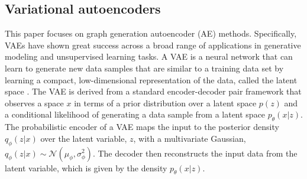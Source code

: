 \subsection{Variational autoencoders}
This paper focuses on graph generation autoencoder (AE) methods. Specifically, VAEs have shown great success across a broad range of applications in generative modeling and unsupervised learning tasks. A VAE is a neural network that can learn to generate new data samples that are similar to a training data set by learning a compact, low-dimensional representation of the data, called the latent space \cite{doersch2016tutorial, pu2016variational}. The VAE is derived from a standard encoder-decoder pair framework that observes a space $x$ in terms of a prior distribution over a latent space $p(z)$ and a conditional likelihood of generating a data sample from a latent space $p_\theta(x|z)$. The probabilistic encoder of a VAE maps the input to the posterior density $q_\phi(z|x)$ over the latent variable, $z$, with a multivariate Gaussian, $q_\phi(z|x)\sim\mathcal{N}(\mu_\phi,\sigma^2_\phi)$. The decoder then reconstructs the input data from the latent variable, which is given by the density $p_\theta(x|z)$. 

